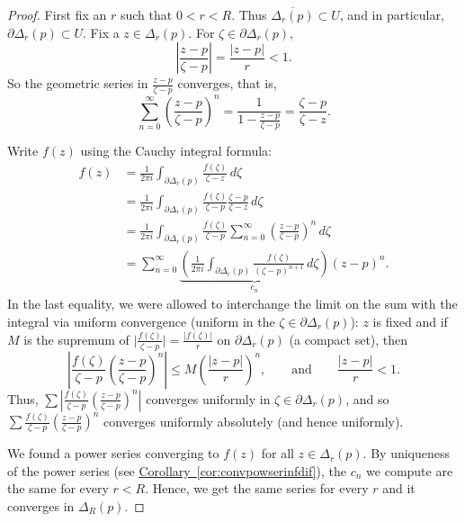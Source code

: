 \documentclass[12pt,openany]{book}
\newcommand{\sabs}[1]{\lvert {#1} \rvert}
\newcommand{\babs}[1]{\bigl\lvert {#1} \bigr\rvert}
\newcommand{\abs}[1]{\left\lvert {#1} \right\rvert}
\theoremstyle{plain}
\theoremstyle{remark}
\theoremstyle{definition}
\theoremstyle{exercise}
\theoremstyle{example}
\newcommand{\corref}[1]{\hyperref[#1]{Corollary~\ref*{#1}}}
\begin{document}
\begin{proof}
First fix an $r$ such that $0 < r < R$.
Thus $\overline{\Delta_r(p)} \subset U$, and in particular,
$\partial \Delta_r(p) \subset U$.
Fix a $z \in \Delta_r(p)$.
For $\zeta \in \partial \Delta_r(p)$, 
\begin{equation*}
\abs{\frac{z-p}{\zeta-p}} =
\frac{\sabs{z-p}}{r} < 1 .
\end{equation*}
So the geometric series in $\frac{z-p}{\zeta-p}$ converges, that is,
\begin{equation*}
\sum_{n=0}^\infty
{\left(\frac{z-p}{\zeta-p}\right)}^n
=
\frac{1}{1-\frac{z-p}{\zeta-p}}
=
\frac{\zeta-p}{\zeta-z} .
\end{equation*}

Write $f(z)$ using the Cauchy integral formula:
\begin{equation*}
\begin{split}
f(z)
& =
\frac{1}{2\pi i}
\int_{\partial \Delta_r(p)}
\frac{f(\zeta)}{\zeta-z}
\,
d \zeta 
\\
& =
\frac{1}{2\pi i}
\int_{\partial \Delta_r(p)}
\frac{f(\zeta)}{\zeta-p}
\frac{\zeta-p}{\zeta-z}
\,
d \zeta 
\\
& =
\frac{1}{2\pi i}
\int_{\partial \Delta_r(p)}
\frac{f(\zeta)}{\zeta-p}
\sum_{n=0}^\infty
{\left(\frac{z-p}{\zeta-p}\right)}^n
\,
d \zeta 
\\
& =
\sum_{n=0}^\infty
\underbrace{
\left(
\frac{1}{2\pi i}
\int_{\partial \Delta_r(p)}
\frac{f(\zeta)}{{(\zeta-p)}^{n+1}}
\,
d \zeta 
\right)
}_{c_n}
{(z-p)}^n .
\end{split}
\end{equation*}
In the last equality, we were allowed to 
interchange the limit on the sum with the integral
via uniform convergence (uniform in the $\zeta \in \partial \Delta_r(p)$):
$z$ is fixed and if $M$ is the supremum of $\babs{\frac{f(\zeta)}{\zeta-p}} =
\frac{\sabs{f(\zeta)}}{r}$ on $\partial \Delta_r(p)$ (a compact set),
then
\begin{equation*}
\abs{
\frac{f(\zeta)}{\zeta-p}
{\left(\frac{z-p}{\zeta-p}\right)}^n
}
\leq
M 
{\left(\frac{\abs{z-p}}{r}\right)}^n,
\qquad \text{and} \qquad
\frac{\abs{z-p}}{r} < 1 .
\end{equation*}
Thus, $\sum 
\abs{
\frac{f(\zeta)}{\zeta-p}
{\left(\frac{z-p}{\zeta-p}\right)}^n
}$ converges uniformly in $\zeta \in \partial \Delta_r(p)$, and so
$\sum 
\frac{f(\zeta)}{\zeta-p}
{\left(\frac{z-p}{\zeta-p}\right)}^n$ converges uniformly absolutely
(and hence uniformly).

We found a power series converging to $f(z)$ for all $z \in \Delta_r(p)$.
By uniqueness of the power series (see \corref{cor:convpowserinfdif}),
the $c_n$ we compute are the same for every $r < R$.  Hence,
we get the same series for every $r$ and it converges in $\Delta_R(p)$.
\end{proof}
\end{document}
